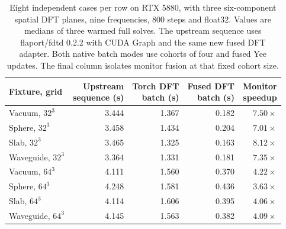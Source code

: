 \begin{table}[tbp]
\centering
\small
\renewcommand{\arraystretch}{1.15}
\caption{Eight independent cases per row on RTX 5880, with three six-component spatial DFT planes, nine frequencies, 800 steps and float32. Values are medians of three warmed full solves. The upstream sequence uses flaport/fdtd 0.2.2 with CUDA Graph and the same new fused DFT adapter. Both native batch modes use cohorts of four and fused Yee updates. The final column isolates monitor fusion at that fixed cohort size.}
\label{tab:spectral-ensembles}
\begin{tabular}{@{}lrrrr@{}}
\toprule
Fixture, grid & \shortstack{Upstream\\sequence (s)} & \shortstack{Torch DFT\\batch (s)} & \shortstack{Fused DFT\\batch (s)} & \shortstack{Monitor\\speedup} \\
\midrule
Vacuum, $32^3$ & 3.444 & 1.367 & 0.182 & $7.50\times$ \\
Sphere, $32^3$ & 3.458 & 1.434 & 0.204 & $7.01\times$ \\
Slab, $32^3$ & 3.465 & 1.325 & 0.163 & $8.12\times$ \\
Waveguide, $32^3$ & 3.364 & 1.331 & 0.181 & $7.35\times$ \\
Vacuum, $64^3$ & 4.111 & 1.560 & 0.370 & $4.22\times$ \\
Sphere, $64^3$ & 4.248 & 1.581 & 0.436 & $3.63\times$ \\
Slab, $64^3$ & 4.114 & 1.606 & 0.395 & $4.06\times$ \\
Waveguide, $64^3$ & 4.145 & 1.563 & 0.382 & $4.09\times$ \\
\bottomrule
\end{tabular}
\end{table}
